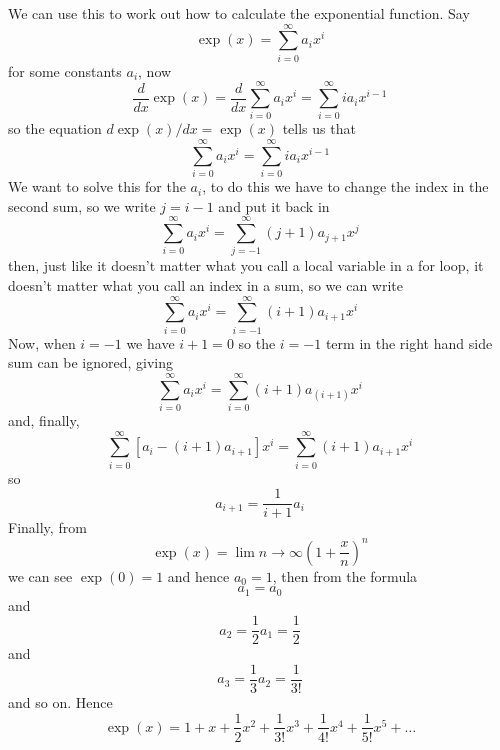 \documentclass[12pt]{article}
\begin{document}
We can use this to work out how to calculate the exponential function. Say 
\begin{equation}
\exp(x)=\sum_{i=0}^\infty a_ix^i
\end{equation}
for some constants $a_i$, now
\begin{equation}
\frac{d}{dx}\exp(x)=\frac{d}{dx}\sum_{i=0}^\infty a_ix^i=\sum_{i=0}^\infty ia_ix^{i-1}
\end{equation}
so the equation $d\exp(x)/dx=\exp(x)$ tells us that
\begin{equation}
\sum_{i=0}^\infty a_ix^i=\sum_{i=0}^\infty ia_ix^{i-1}
\end{equation}
We want to solve this for the $a_i$, to do this we have to change the index in the second sum, so we write $j=i-1$ and put it back in
\begin{equation}
\sum_{i=0}^\infty a_ix^i=\sum_{j=-1}^\infty (j+1)a_{j+1}x^{j}
\end{equation}
then, just like it doesn't matter what you call a local variable in a for loop, it doesn't matter what you call an index in a sum, so we can write
\begin{equation}
\sum_{i=0}^\infty a_ix^i=\sum_{i=-1}^\infty (i+1)a_{i+1}x^{i}
\end{equation}
Now, when $i=-1$ we have $i+1=0$ so the $i=-1$ term in the right hand side sum can be ignored, giving
\begin{equation}
\sum_{i=0}^\infty a_ix^i=\sum_{i=0}^\infty (i+1)a_(i+1)x^{i}
\end{equation}
and, finally,
\begin{equation}
\sum_{i=0}^\infty [a_i-(i+1)a_{i+1}]x^i=\sum_{i=0}^\infty (i+1)a_{i+1}x^{i}
\end{equation}
so 
\begin{equation}
a_{i+1}=\frac{1}{i+1}a_i
\end{equation}
Finally, from
\begin{equation}
\exp(x)=\lim{n\rightarrow \infty}\left(1+\frac{x}{n}\right)^n
\end{equation}
we can see $\exp(0)=1$ and hence $a_0=1$, then from the formula
\begin{equation}
a_1=a_0
\end{equation}
and 
\begin{equation}
a_2=\frac{1}{2}a_1=\frac{1}{2}
\end{equation}
and
\begin{equation}
a_3=\frac{1}{3}a_2=\frac{1}{3!}
\end{equation}
and so on. Hence
\begin{equation}
\exp(x)=1+x+\frac{1}{2}x^2+\frac{1}{3!}x^3+\frac{1}{4!}x^4+\frac{1}{5!}x^5+\ldots
\end{equation}
\end{document}
